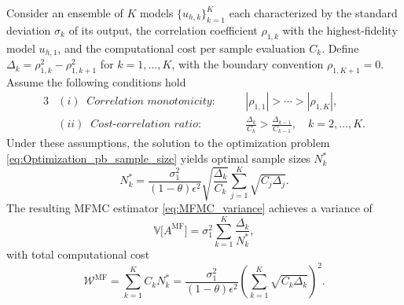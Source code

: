 %
\begin{theorem}
\label{thm:Sample_size_est}
Consider an ensemble of $K$ models $\{u_{h,k}\}_{k=1}^K$ each characterized by the standard deviation $\sigma_k$ of its output, the correlation coefficient $\rho_{1,k}$ with the highest-fidelity model $u_{h,1}$, and the computational cost per sample evaluation $C_k$. Define $\Delta_k = \rho_{1,k}^2 - \rho_{1,k+1}^2$ for $k = 1, \dots, K$, with the boundary convention $\rho_{1,K+1} = 0$. Assume the following conditions hold
%
\begin{alignat*}{3}
&(i)\;\; \textit{Correlation monotonicity}: \quad && |\rho_{1,1}| > \cdots > |\rho_{1,K}|, \\ 
&(ii)\;\; \textit{Cost-correlation ratio}: \quad && \frac{\Delta_k}{C_k} > \frac{\Delta_{k-1}}{C_{k-1}}, \quad k=2,\ldots,K. 
\end{alignat*}
%
Under these assumptions, the solution to the optimization problem \eqref{eq:Optimization_pb_sample_size} 
yields optimal sample sizes $N_k^*$
%
\begin{equation}  \label{eq:MFMC_SampleSize}
    N_k^*=\frac{\sigma_1^2}{(1-\theta)\epsilon^2}\sqrt{\frac{\Delta_k}{C_k}}\sum_{j=1}^K\sqrt{C_j\Delta_{j}}.
\end{equation}
%
The resulting MFMC estimator \eqref{eq:MFMC_variance} achieves a variance of
%
\begin{equation}
\label{eq:MFMC_variance_optimal}
\mathbb{V}\big[A^{\text{MF}}\big] =
\sigma_1^2\sum_{k=1}^K\frac{\Delta_k}{N_k^*},
\end{equation}
%
with total computational cost
%
\begin{equation}\label{eq:MFMC_sampling_cost}
    \mathcal{W}^\text{MF} = \sum_{k=1}^K C_k N_k^* = \frac{\sigma_1^2}{(1-\theta)\epsilon^2}\left(\sum_{k=1}^K\sqrt{C_k\Delta_k}\right)^2.
\end{equation}
%
\end{theorem}


